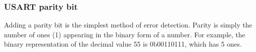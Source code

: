 \documentclass[
a4paper, %
11pt, %
onecolumn, %
openany, %
]{memoir}
\begin{document}
\subsubsection{USART parity bit}
Adding a parity bit is the simplest method of error detection. Parity is simply the number of ones (1) appearing in the binary form of a number. For example, the binary representation of the decimal value 55 is 0b00110111, which has 5 ones.

\mainmatter










% 
% 
\end{document}
